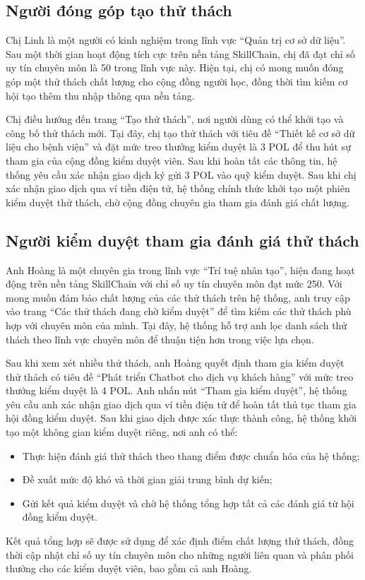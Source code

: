 \subsection{Người đóng góp tạo thử thách}

Chị Linh là một người có kinh nghiệm trong lĩnh vực ``Quản trị cơ sở dữ liệu''. Sau một thời gian hoạt động tích cực trên nền tảng SkillChain, chị đã đạt chỉ số uy tín chuyên môn là 50 trong lĩnh vực này.
Hiện tại, chị có mong muốn đóng góp một thử thách chất lượng cho cộng đồng người học, đồng thời tìm kiếm cơ hội tạo thêm thu nhập thông qua nền tảng.

Chị điều hướng đến trang ``Tạo thử thách'', nơi người dùng có thể khởi tạo và công bố thử thách mới. Tại đây, chị tạo thử thách với tiêu đề ``Thiết kế cơ sở dữ liệu cho bệnh viện'' và đặt mức treo thưởng kiểm duyệt là 3 POL để thu hút sự tham gia của cộng đồng kiểm duyệt viên.
Sau khi hoàn tất các thông tin, hệ thống yêu cầu xác nhận giao dịch ký gửi 3 POL vào quỹ kiểm duyệt. Sau khi chị xác nhận giao dịch qua ví tiền điện tử, hệ thống chính thức khởi tạo một phiên kiểm duyệt thử thách, chờ cộng đồng chuyên gia tham gia đánh giá chất lượng.

\subsection{Người kiểm duyệt tham gia đánh giá thử thách}

Anh Hoàng là một chuyên gia trong lĩnh vực ``Trí tuệ nhân tạo'', hiện đang hoạt động trên nền tảng SkillChain với chỉ số uy tín chuyên môn đạt mức 250.
Với mong muốn đảm bảo chất lượng của các thử thách trên hệ thống, anh truy cập vào trang ``Các thử thách đang chờ kiểm duyệt'' để tìm kiếm các thử thách phù hợp với chuyên môn của mình. 
Tại đây, hệ thống hỗ trợ anh lọc danh sách thử thách theo lĩnh vực chuyên môn để thuận tiện hơn trong việc lựa chọn.

Sau khi xem xét nhiều thử thách, anh Hoàng quyết định tham gia kiểm duyệt thử thách có tiêu đề ``Phát triển Chatbot cho dịch vụ khách hàng'' với mức treo thưởng kiểm duyệt là 4 POL.
Anh nhấn nút ``Tham gia kiểm duyệt'', hệ thống yêu cầu anh xác nhận giao dịch qua ví tiền điện tử để hoàn tất thủ tục tham gia hội đồng kiểm duyệt. Sau khi giao dịch được xác thực thành công, hệ thống khởi tạo một không gian kiểm duyệt riêng, nơi anh có thể:

\begin{itemize}
  \item Thực hiện đánh giá thử thách theo thang điểm được chuẩn hóa của hệ thống;
  \item Đề xuất mức độ khó và thời gian giải trung bình dự kiến;
  \item Gửi kết quả kiểm duyệt và chờ hệ thống tổng hợp tất cả các đánh giá từ hội đồng kiểm duyệt.
\end{itemize}
Kết quả tổng hợp sẽ được sử dụng để xác định điểm chất lượng thử thách, đồng thời cập nhật chỉ số uy tín chuyên môn cho những người liên quan và phân phối thưởng cho các kiểm duyệt viên, bao gồm cả anh Hoàng.

